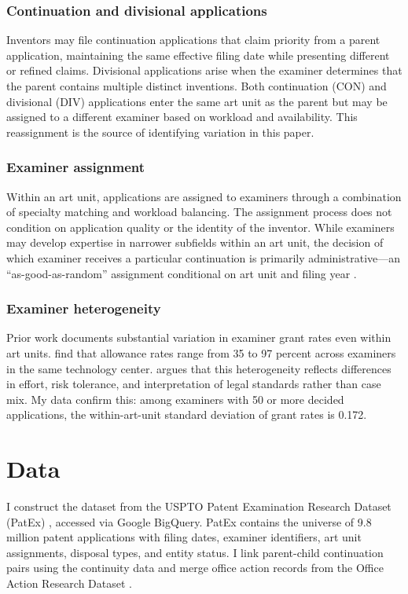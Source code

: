 \documentclass[12pt]{article}
\begin{document}
\subsubsection*{Continuation and divisional applications} Inventors may file continuation applications that claim priority from a parent application, maintaining the same effective filing date while presenting different or refined claims. Divisional applications arise when the examiner determines that the parent contains multiple distinct inventions. Both continuation (CON) and divisional (DIV) applications enter the same art unit as the parent but may be assigned to a different examiner based on workload and availability. This reassignment is the source of identifying variation in this paper.

\subsubsection*{Examiner assignment} Within an art unit, applications are assigned to examiners through a combination of specialty matching and workload balancing. The assignment process does not condition on application quality or the identity of the inventor. While examiners may develop expertise in narrower subfields within an art unit, the decision of which examiner receives a particular continuation is primarily administrative---an ``as-good-as-random'' assignment conditional on art unit and filing year \citep{sampat2019examiner}.

\subsubsection*{Examiner heterogeneity} Prior work documents substantial variation in examiner grant rates even within art units. \citet{cockburn2003all} find that allowance rates range from 35 to 97 percent across examiners in the same technology center. \citet{lemley2001rational} argues that this heterogeneity reflects differences in effort, risk tolerance, and interpretation of legal standards rather than case mix. My data confirm this: among examiners with 50 or more decided applications, the within-art-unit standard deviation of grant rates is 0.172.


\section{Data}
\label{sec:data}

I construct the dataset from the USPTO Patent Examination Research Dataset (PatEx) \citep{marco2015patent}, accessed via Google BigQuery. PatEx contains the universe of 9.8 million patent applications with filing dates, examiner identifiers, art unit assignments, disposal types, and entity status. I link parent-child continuation pairs using the continuity data and merge office action records from the Office Action Research Dataset \citep{lu2017USPTO}.
\end{document}
